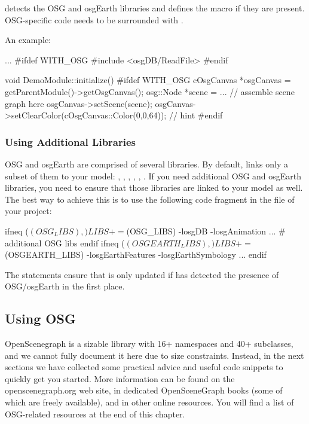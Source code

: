 {\opp} detects the OSG and osgEarth libraries and defines the  macro
if they are present. OSG-specific code needs to be surrounded with .

An example:

\begin{cpp}
...
#ifdef WITH_OSG
#include <osgDB/ReadFile>
#endif

void DemoModule::initialize()
{
#ifdef WITH_OSG
    cOsgCanvas *osgCanvas = getParentModule()->getOsgCanvas();
    osg::Node *scene = ... // assemble scene graph here
    osgCanvas->setScene(scene);
    osgCanvas->setClearColor(cOsgCanvas::Color(0,0,64)); // hint
#endif
}
\end{cpp}

\subsubsection{Using Additional Libraries}
\label{sec:graphics:using-additional-osg-libraries}

OSG and osgEarth are comprised of several libraries. By default, {\opp}
links only a subset of them to your model: , ,
, , , . If you
need additional OSG and osgEarth libraries, you need to ensure that those
libraries are linked to your model as well. The best way to achieve this is
to use the following code fragment in the  file of your
project:

\begin{filelisting}
ifneq ($(OSG_LIBS),)
LIBS += $(OSG_LIBS) -losgDB -losgAnimation ... # additional OSG libs
endif
ifneq ($(OSGEARTH_LIBS),)
LIBS += $(OSGEARTH_LIBS) -losgEarthFeatures -losgEarthSymbology ...
endif
\end{filelisting}

The  statements ensure that  is only updated if {\opp} has detected
the presence of OSG/osgEarth in the first place.


\subsection{Using OSG}
\label{sec:graphics:using-osg}

OpenScenegraph is a sizable library with 16+ namespaces and 40+ 
subclasses, and we cannot fully document it here due to size constraints. Instead,
in the next sections we have collected some practical advice and useful code snippets
to quickly get you started. More information can be found on the openscenegraph.org
web site, in dedicated OpenSceneGraph books (some of which are freely available),
and in other online resources. You will find a list of OSG-related resources
at the end of this chapter.

